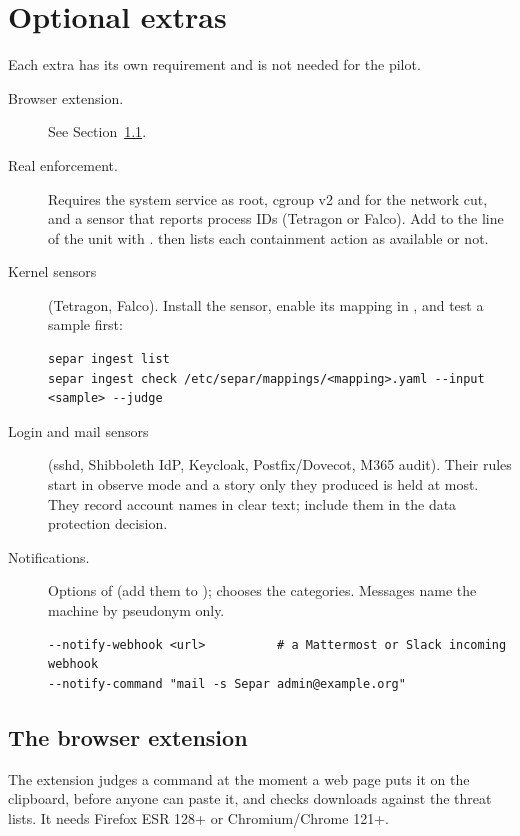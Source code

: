 \documentclass[11pt,a4paper]{article}
\begin{document}
\section{Optional extras}
\label{sec:extras}
Each extra has its own requirement and is not needed for the pilot.
\begin{description}
  \item[Browser extension.] See Section~\ref{sec:browser}.
  \item[Real enforcement.] Requires the system service as root, cgroup v2 and  for the
    network cut, and a sensor that reports process IDs (Tetragon or Falco). Add  to
    the  line of the unit with . 
    then lists each containment action as available or not.
  \item[Kernel sensors] (Tetragon, Falco). Install the sensor, enable its mapping in
    , and test a sample first:
\begin{lstlisting}
separ ingest list
separ ingest check /etc/separ/mappings/<mapping>.yaml --input <sample> --judge
\end{lstlisting}
  \item[Login and mail sensors] (sshd, Shibboleth IdP, Keycloak, Postfix/Dovecot, M365 audit). Their
    rules start in observe mode and a story only they produced is held at most. They record account
    names in clear text; include them in the data protection decision.
  \item[Notifications.] Options of  (add them to ); 
    chooses the categories. Messages name the machine by pseudonym only.
\begin{lstlisting}
--notify-webhook <url>          # a Mattermost or Slack incoming webhook
--notify-command "mail -s Separ admin@example.org"
\end{lstlisting}
\end{description}

\subsection{The browser extension}
\label{sec:browser}
The extension judges a command at the moment a web page puts it on the clipboard, before anyone
can paste it, and checks downloads against the threat lists. It needs Firefox ESR 128+ or
Chromium/Chrome 121+.
\end{document}
